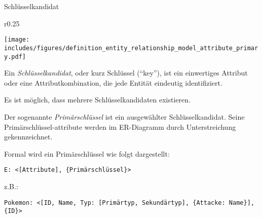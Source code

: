 \begin{defi}{Schlüsselkandidat}
    \begin{wrapfigure}{r}{0.25\textwidth}
        \begin{center}
            \texttt{[image: includes/figures/definition\_entity\_relationship\_model\_attribute\_primary.pdf]}
        \end{center}
    \end{wrapfigure}
    Ein \emph{Schlüsselkandidat}, oder kurz Schlüssel (\enquote{key}), ist ein einwertiges Attribut oder eine Attributkombination, die jede Entität eindeutig identifiziert.

    Es ist möglich, dass mehrere Schlüsselkandidaten existieren.

    Der sogenannte \emph{Primärschlüssel} ist ein ausgewählter Schlüsselkandidat.
    Seine Primärschlüssel-attribute werden im ER-Diagramm durch Unterstreichung gekennzeichnet.

    Formal wird ein Primärschlüssel wie folgt dargestellt:
    \begin{center}
        \texttt{E: <[Attribute], \{Primärschlüssel\}>}
    \end{center}
    z.B.:
    \begin{center}
        \texttt{Pokemon: <[ID, Name, Typ: [Primärtyp, Sekundärtyp], \{Attacke: Name\}], \{ID\}>}
    \end{center}
\end{defi}

